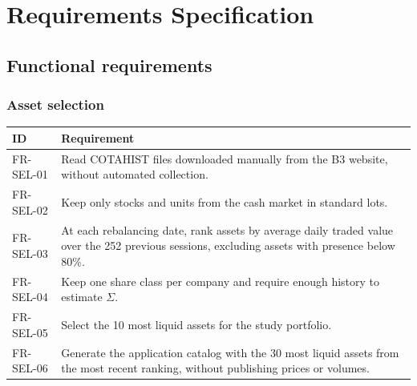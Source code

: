 \chapter{Requirements Specification}

\section{Functional requirements}

\subsection{Asset selection}
\begin{tabularx}{\textwidth}{@{}lX@{}}
\toprule
\textbf{ID} & \textbf{Requirement} \\ \midrule
FR-SEL-01 & Read COTAHIST files downloaded manually from the B3 website, without automated collection. \\
FR-SEL-02 & Keep only stocks and units from the cash market in standard lots. \\
FR-SEL-03 & At each rebalancing date, rank assets by average daily traded value over the 252 previous sessions, excluding assets with presence below 80\%. \\
FR-SEL-04 & Keep one share class per company and require enough history to estimate $\Sigma$. \\
FR-SEL-05 & Select the 10 most liquid assets for the study portfolio. \\
FR-SEL-06 & Generate the application catalog with the 30 most liquid assets from the most recent ranking, without publishing prices or volumes. \\
\bottomrule
\end{tabularx}

